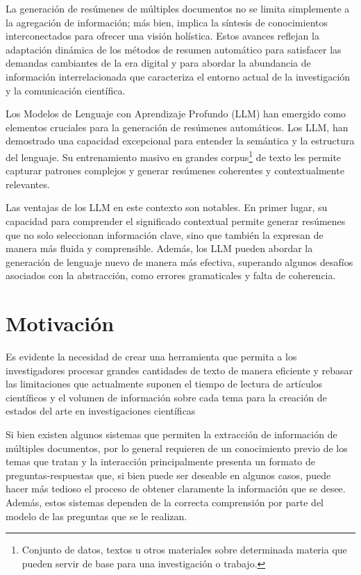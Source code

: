     La generación de resúmenes de múltiples documentos no se limita simplemente a la agregación de información; más bien, implica la síntesis de conocimientos interconectados para ofrecer una visión holística. 
    Estos avances reflejan la adaptación dinámica de los métodos de resumen automático para satisfacer las demandas cambiantes de la era digital y para abordar la abundancia de información interrelacionada que caracteriza el entorno actual de la investigación y la comunicación científica.

    Los Modelos de Lenguaje con Aprendizaje Profundo (LLM) han emergido como elementos cruciales para la generación de resúmenes automáticos. Los LLM, han demostrado una capacidad excepcional para entender la semántica y la estructura del lenguaje\cite{fewshot}. Su entrenamiento masivo en grandes corpus\footnote{Conjunto de datos, textos u otros materiales sobre determinada materia que pueden servir de base para una investigación o trabajo.} de texto les permite capturar patrones complejos y generar resúmenes coherentes y contextualmente relevantes.

    Las ventajas de los LLM en este contexto son notables. En primer lugar, su capacidad para comprender el significado contextual permite generar resúmenes que no solo seleccionan información clave, sino que también la expresan de manera más fluida y comprensible\cite{Radford2018ImprovingLU}. Además, los LLM pueden abordar la generación de lenguaje nuevo de manera más efectiva, superando algunos desafíos asociados con la abstracción, como errores gramaticales y falta de coherencia\cite{RoBERTa}.

\section{Motivación}
    Es evidente la necesidad de crear una herramienta que permita a los investigadores procesar grandes cantidades de texto de manera eficiente y rebasar las limitaciones que actualmente suponen el tiempo de lectura de artículos científicos y el volumen de información sobre cada tema para la creación de estados del arte en investigaciones científicas

    Si bien existen algunos sistemas\cite{elicit, scite} que permiten la extracción de información de múltiples documentos, por lo general requieren de un conocimiento previo de los temas que tratan y la interacción principalmente presenta un formato de preguntas-respuestas que, si bien puede ser deseable en algunos casos, puede hacer más tedioso el proceso de obtener claramente la información que se desee. Además, estos sistemas dependen de la correcta comprensión por parte del modelo de las preguntas que se le realizan.

